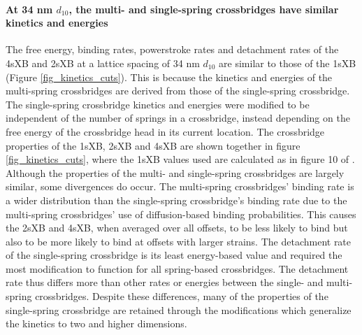 \documentclass[]{article}
\begin{document}
\paragraph{At 34 nm $d_{10}$, the multi- and single-spring crossbridges have similar kinetics and energies} %
The free energy, binding rates, powerstroke rates and detachment rates of the 4sXB and 2sXB at a lattice spacing of 34 nm $d_{10}$ are similar to those of the 1sXB (Figure \ref{fig_kinetics_cuts}). 
This is because the kinetics and energies of the multi-spring crossbridges are derived from those of the single-spring crossbridge. 
The single-spring crossbridge kinetics and energies were modified to be independent of the number of springs in a crossbridge, instead depending on the free energy of the crossbridge head in its current location. 
The crossbridge properties of the 1sXB, 2sXB and 4sXB are shown together in figure \ref{fig_kinetics_cuts}, where the 1sXB values used are calculated as in figure 10 of \citet{Tanner:2007:pe115}. 
Although the properties of the multi- and single-spring crossbridges are largely similar, some divergences do occur. 
The multi-spring crossbridges' binding rate is a wider distribution than the single-spring crossbridge's binding rate due to the multi-spring crossbridges' use of diffusion-based binding probabilities.
This causes the 2sXB and 4sXB, when averaged over all offsets, to be less likely to bind but also to be more likely to bind at offsets with larger strains. 
The detachment rate of the single-spring crossbridge is its least energy-based value and required the most modification to function for all spring-based crossbridges. 
The detachment rate thus differs more than other rates or energies between the single- and multi-spring crossbridges. 
Despite these differences, many of the properties of the single-spring crossbridge are retained through the modifications which generalize the kinetics to two and higher dimensions. 
\end{document}
